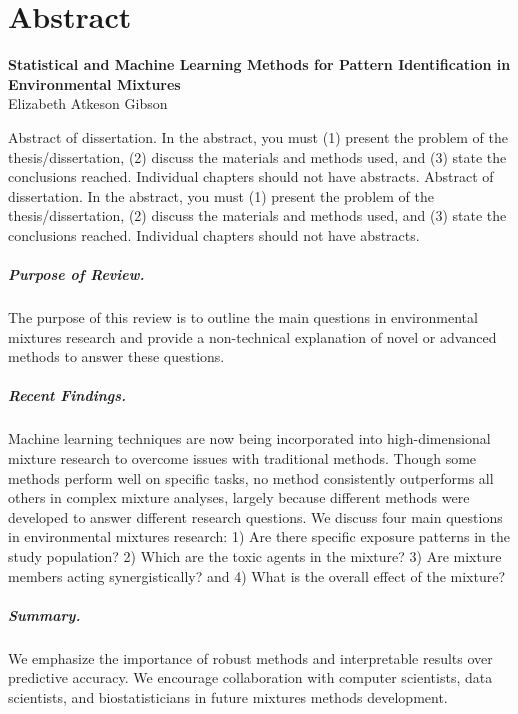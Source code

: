 \thispagestyle{empty}
\chapter*{Abstract}
\vspace{-2.5em}
\begin{center}
    \large \textbf{Statistical and Machine Learning Methods for Pattern Identification in Environmental Mixtures} \\
    Elizabeth Atkeson Gibson \\
\end{center}
\thispagestyle{empty}

Abstract of dissertation. In the abstract, you must (1) present the problem of the thesis/dissertation, (2) discuss the materials and methods used, and (3) state the conclusions reached. Individual chapters should not have abstracts.	Abstract of dissertation. In the abstract, you must (1) present the problem of the thesis/dissertation, (2) discuss the materials and methods used, and (3) state the conclusions reached. Individual chapters should not have abstracts.
	
\paragraph{Purpose of Review.}

The purpose of this review is to outline the main questions in environmental mixtures research and provide a non-technical explanation of novel or advanced methods to answer these questions.

\paragraph{Recent Findings.} 

Machine learning techniques are now being incorporated into high-dimensional mixture research to overcome issues with traditional methods. Though some methods perform well on specific tasks, no method consistently outperforms all others in complex mixture analyses, largely because different methods were developed to answer different research questions. We discuss four main questions in environmental mixtures research: 1) Are there specific exposure patterns in the study population? 2) Which are the toxic agents in the mixture? 3) Are mixture members acting synergistically? and 4) What is the overall effect of the mixture? 

\paragraph{Summary.} 

We emphasize the importance of robust methods and interpretable results over predictive accuracy. We encourage collaboration with computer scientists, data scientists, and biostatisticians in future mixtures methods development.

\thispagestyle{empty} 
\clearpage


